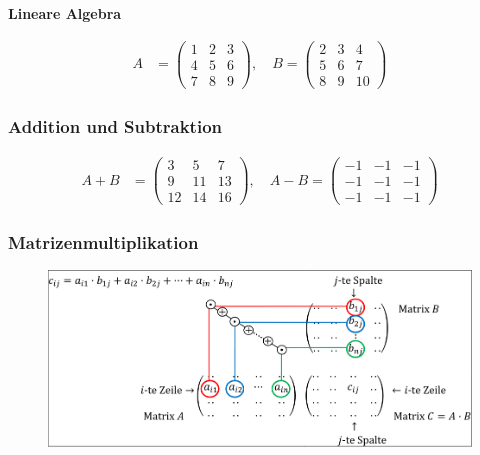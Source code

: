 \documentclass{article}
\begin{document}
\begin{center}
\textbf{\LARGE Lineare Algebra}
\end{center}

\begin{minipage}[t]{0.45\textwidth}
    \begin{align*}
        A &= \begin{pmatrix}
        1 & 2 & 3 \\
        4 & 5 & 6 \\
        7 & 8 & 9
        \end{pmatrix}, \quad
        B = \begin{pmatrix}
        2 & 3 & 4 \\
        5 & 6 & 7 \\
        8 & 9 & 10
        \end{pmatrix}
    \end{align*}
    \subsubsection*{Addition und Subtraktion}
    \begin{align*}
    A + B &= \begin{pmatrix}
    3 & 5 & 7 \\
    9 & 11 & 13 \\
    12 & 14 & 16
    \end{pmatrix}, \quad
    A - B = \begin{pmatrix}
    -1 & -1 & -1 \\
    -1 & -1 & -1 \\
    -1 & -1 & -1
    \end{pmatrix}
    \end{align*}

    \subsubsection*{Matrizenmultiplikation}
    \begin{figure}[H]
        \includegraphics[scale=0.2]{images/matrixmult.png}
    \end{figure}
\end{minipage}
\end{document}
